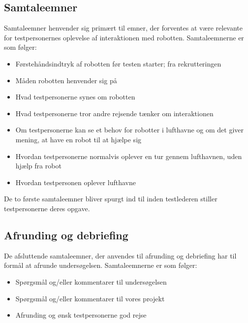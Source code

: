 \subsection{Samtaleemner} 
\label{ParametreSamtaleemner}
%
Samtaleemner henvender sig primært til emner, der forventes at være relevante for testpersonernes oplevelse af interaktionen med robotten. Samtaleemnerne er som følger:\blankline
%
\begin{itemize}
\item Førstehåndsindtryk af robotten før testen starter; fra rekrutteringen
\item Måden robotten henvender sig på
\item Hvad testpersonerne synes om robotten
\item Hvad testpersonerne tror andre rejsende tænker om interaktionen 
\item Om testpersonerne kan se et behov for robotter i lufthavne og om det giver mening, at have en robot til at hjælpe sig
\item Hvordan testpersonerne normalvis oplever en tur gennem lufthavnen, uden hjælp fra robot
\item Hvordan testpersonen oplever lufthavne 
\end{itemize}
%
De to første samtaleemner bliver spurgt ind til inden testlederen stiller testpersonerne deres opgave. 
%

\subsection{Afrunding og debriefing} 
\label{ParametreAfrundingDebriefing}
%
De afsluttende samtaleemner, der anvendes til afrunding og debriefing har til formål at afrunde undersøgelsen. Samtaleemnerne er som følger: \blankline
%
\begin{itemize}
\item Spørgsmål og/eller kommentarer til undersøgelsen 
\item Spørgsmål og/eller kommentarer til vores projekt
\item Afrunding og ønsk testpersonerne god rejse
\end{itemize}

